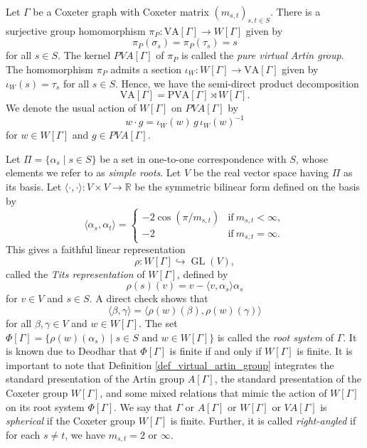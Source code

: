 \documentclass[12pt]{amsart}
\numberwithin{equation}{section}
\newcommand{\GL}{\operatorname{GL}}
\begin{document}
Let $\Gamma$ be a Coxeter graph  with Coxeter matrix $(m_{s,t})_{s,t\in S}$. There is a surjective group homomorphism $\pi_P: \mathrm{VA}[\Gamma] \rightarrow W[\Gamma]$ given by 
$$\pi_P(\sigma_s) = \pi_P(\tau_s)= s$$ 
for all $s \in S$. The kernel $PVA[\Gamma]$  of $\pi_P$ is called the {\it pure virtual Artin group}.  The homomorphism $\pi_P$ admits a section $\iota_W: W[\Gamma] \rightarrow \mathrm{VA}[\Gamma]$ given by $\iota_W(s)=\tau_s$ for all $s \in S$. Hence, we have the semi-direct product decomposition 
\begin{equation}\label{decomposition of VA Gamma}
\mathrm{VA}[\Gamma]=\mathrm{PVA}[\Gamma] \rtimes W[\Gamma].
\end{equation}
 We denote the usual action of $W[\Gamma]$ on $PVA[\Gamma]$ by 
\begin{equation}\label{conjugation action of coxeter group}
w\cdot g=\iota_W(w)\,g\,\iota_W(w)^{-1}
\end{equation}
 for $w\in W[\Gamma]$ and $g\in PVA[\Gamma]$.
\par


Let $\Pi=\{\alpha_s\mid s\in S\}$ be a set in one-to-one correspondence with $S$, whose elements we refer to  as {\it simple roots}. Let $V$ be the real vector space having $\Pi$ as its basis. Let $\langle\cdot,\cdot\rangle:V\times V\to \mathbb{R}$ be the symmetric bilinear form defined on the basis by
$$
\langle \alpha_s,\alpha_t\rangle=\left\{\begin{array}{ll}
-2\cos(\pi/m_{s,t})&\text{if}~m_{s,t}<\infty,\\
-2&\text{if}~m_{s,t}=\infty.
\end{array}\right.
$$
This gives a faithful linear representation $$\rho: W[\Gamma]\hookrightarrow\GL(V),$$ called the \emph{Tits representation} of $W[\Gamma]$, defined by
$$
\rho(s)(v)=v-\langle v,\alpha_s\rangle\alpha_s
$$
for $v\in V$ and $s\in S$. A direct check shows that 
$$\langle \beta, \gamma \rangle = \langle \rho(w)(\beta), \rho(w)(\gamma) \rangle$$
 for all $\beta, \gamma \in V$ and $w \in W[\Gamma]$. The set $\Phi[\Gamma]=\{\rho(w)(\alpha_s)\mid s\in S\text{ and }w\in W[\Gamma]\}$ is called the {\it root system} of $\Gamma$.  It is known due to Deodhar \cite{MR0647210} that $\Phi[\Gamma]$ is finite if and only if $W[\Gamma]$ is finite. It is important to note that Definition \ref{def_virtual_artin_group} integrates the standard presentation of the Artin group $A[\Gamma]$, the standard presentation of the Coxeter group $W[\Gamma]$, and some mixed relations that mimic the action of $W[\Gamma]$ on its root system $\Phi[\Gamma]$.  We say that $\Gamma$ or $A[\Gamma]$ or $W[\Gamma]$ or $VA[\Gamma]$ is {\it spherical} if the Coxeter group  $W[\Gamma]$ is finite. Further, it is called  {\it right-angled} if for each $s \ne t$, we have $m_{s, t}=2$ or $\infty$. 
\par
\end{document}
